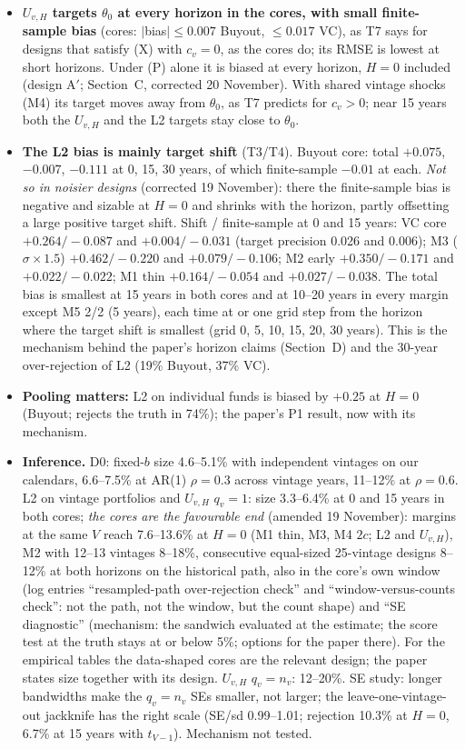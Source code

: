 \documentclass[11pt]{article}
\begin{document}
\begin{itemize}
\item \textbf{$U_{v,H}$ targets $\theta_0$ at every horizon in the cores, with small finite-sample bias} (cores: $|$bias$|\le0.007$ Buyout, $\le0.017$ VC), as T7 says for designs that satisfy (X) with $c_v=0$, as the cores do; its RMSE is lowest at short horizons. Under (P) alone it is biased at every horizon, $H=0$ included (design A$'$; Section~C, corrected 20 November). With shared vintage shocks (M4) its target moves away from $\theta_0$, as T7 predicts for $c_v>0$; near 15 years both the $U_{v,H}$ and the L2 targets stay close to $\theta_0$.
\item \textbf{The L2 bias is mainly target shift} (T3/T4). Buyout core: total $+0.075$, $-0.007$, $-0.111$ at 0, 15, 30 years, of which finite-sample $-0.01$ at each. \emph{Not so in noisier designs} (corrected 19 November): there the finite-sample bias is negative and sizable at $H=0$ and shrinks with the horizon, partly offsetting a large positive target shift. Shift / finite-sample at 0 and 15 years: VC core $+0.264/-0.087$ and $+0.004/-0.031$ (target precision 0.026 and 0.006); M3 ($\sigma\times1.5$) $+0.462/-0.220$ and $+0.079/-0.106$; M2 early $+0.350/-0.171$ and $+0.022/-0.022$; M1 thin $+0.164/-0.054$ and $+0.027/-0.038$. The total bias is smallest at 15 years in both cores and at 10--20 years in every margin except M5 2/2 (5 years), each time at or one grid step from the horizon where the target shift is smallest (grid 0, 5, 10, 15, 20, 30 years). This is the mechanism behind the paper's horizon claims (Section~D) and the 30-year over-rejection of L2 (19\% Buyout, 37\% VC).
\item \textbf{Pooling matters:} L2 on individual funds is biased by $+0.25$ at $H=0$ (Buyout; rejects the truth in 74\%); the paper's P1 result, now with its mechanism.
\item \textbf{Inference.} D0: fixed-$b$ size 4.6--5.1\% with independent vintages on our calendars, 6.6--7.5\% at AR(1) $\rho=0.3$ across vintage years, 11--12\% at $\rho=0.6$. L2 on vintage portfolios and $U_{v,H}$ $q_v=1$: size 3.3--6.4\% at 0 and 15 years in both cores; \emph{the cores are the favourable end} (amended 19 November): margins at the same $V$ reach 7.6--13.6\% at $H=0$ (M1 thin, M3, M4 $2c$; L2 and $U_{v,H}$), M2 with 12--13 vintages 8--18\%, consecutive equal-sized 25-vintage designs 8--12\% at both horizons on the historical path, also in the core's own window (log entries ``resampled-path over-rejection check'' and ``window-versus-counts check'': not the path, not the window, but the count shape) and ``SE diagnostic'' (mechanism: the sandwich evaluated at the estimate; the score test at the truth stays at or below 5\%; options for the paper there). For the empirical tables the data-shaped cores are the relevant design; the paper states size together with its design. $U_{v,H}$ $q_v=n_v$: 12--20\%. SE study: longer bandwidths make the $q_v=n_v$ SEs smaller, not larger; the leave-one-vintage-out jackknife has the right scale (SE/sd 0.99--1.01; rejection 10.3\% at $H=0$, 6.7\% at 15 years with $t_{V-1}$). Mechanism not tested.

\end{itemize}
\end{document}
